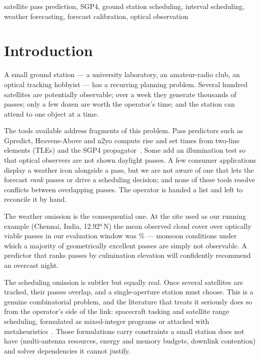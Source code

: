 \documentclass[conference]{IEEEtran}
\begin{document}
\begin{IEEEkeywords}
satellite pass prediction, SGP4, ground station scheduling, interval scheduling,
weather forecasting, forecast calibration, optical observation
\end{IEEEkeywords}

\section{Introduction}

A small ground station --- a university laboratory, an amateur-radio club, an
optical tracking hobbyist --- has a recurring planning problem. Several hundred
satellites are potentially observable; over a week they generate thousands of
passes; only a few dozen are worth the operator's time; and the station can
attend to one object at a time.

The tools available address fragments of this problem. Pass predictors such as
Gpredict, Heavens-Above and n2yo compute rise and set times from two-line
elements (TLEs) and the SGP4 propagator~\cite{hoots1980spacetrack,
vallado2006revisiting}. Some add an illumination test so that optical observers
are not shown daylight passes. A few consumer applications display a weather
icon alongside a pass, but we are not aware of one that lets the forecast
\emph{rank} passes or drive a scheduling decision; and none of these tools
resolve conflicts between overlapping passes. The operator is handed a list and
left to reconcile it by hand.

The weather omission is the consequential one. At the site used as our running
example (Chennai, India, \ang{12.92}\,N) the mean observed cloud cover over
optically viable passes in our evaluation window was \CloudChennai\% --- monsoon
conditions under which a majority of geometrically excellent passes are simply
not observable. A predictor that ranks passes by culmination elevation will
confidently recommend an overcast night.

The scheduling omission is subtler but equally real. Once several satellites are
tracked, their passes overlap, and a single-aperture station must choose. This is
a genuine combinatorial problem, and the literature that treats it seriously does
so from the operator's side of the link: spacecraft tasking and satellite range
scheduling, formulated as mixed-integer programs or attacked with
metaheuristics~\cite{barbulescu2004satellite, marinelli2011lagrangian,
chen2019mixed, song2019learning, wang2020review}. Those formulations carry
constraints a small station does not have (multi-antenna resources, energy and
memory budgets, downlink contention) and solver dependencies it cannot justify.
\end{document}
